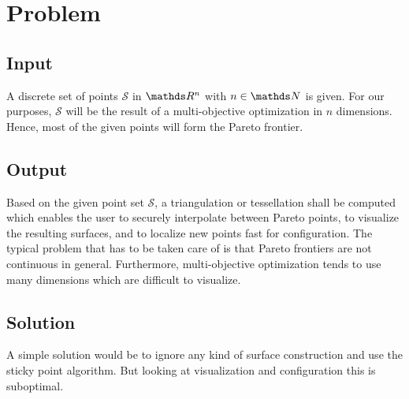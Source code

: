 \documentclass{stdlocal}
\begin{document}
\section{Problem} %
\label{sec:problem}
  \subsection{Input} %
  \label{sub:input}
    A discrete set of points $\mathcal{S}$ in $\realnumbers^n$ with $n\in\naturalnumbers$ is given.
    For our purposes, $\mathcal{S}$ will be the result of a multi-objective optimization in $n$ dimensions.
    Hence, most of the given points will form the Pareto frontier.

  \subsection{Output} %
  \label{sub:output}
    Based on the given point set $\mathcal{S}$, a triangulation or tessellation shall be computed which enables the user to securely interpolate between Pareto points, to visualize the resulting surfaces, and to localize new points fast for configuration.
    The typical problem that has to be taken care of is that Pareto frontiers are not continuous in general.
    Furthermore, multi-objective optimization tends to use many dimensions which are difficult to visualize.

  \subsection{Solution} %
  \label{sub:solution}
    A simple solution would be to ignore any kind of surface construction and use the sticky point algorithm.
    But looking at visualization and configuration this is suboptimal.
\end{document}
